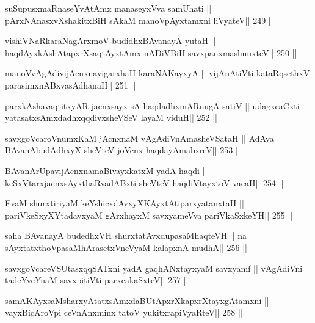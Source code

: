 \begin{shl}
suSupusxmaRnaseYvA\s\s tAmx manaseyxVva samUhati ||
pArxNAnasxvXshakitxBiH sAkaM manoV\s pAyxtamxni liVyateV\hfill || 249 ||
\end{shl}

\begin{shl}
vishiVNaRkaraNagArxmoV budidhxBAvanayA yutaH ||
haqdAyxkAshAtapxrXsaqtAyx\s\s tAmx nADiVBiH savxpanxmashunxteV\hfill || 250 ||
\end{shl}

\begin{shl}
manoVvAgAdivijAcnxnavigarxhaH karaNAKayxyA ||
vijAnAtiVti kataRqsethxV parasimxnABxvasAdhanaH\hfill || 251 ||
\end{shl}

\begin{shl}
parxkAshavaqtitxyAR jacnxsayx sA haqdadhxmARnugA satiV ||
udagxcaCxti yatasatxsAmxdadhxqqdivxsheVSeV layaM viduH\hfill || 252 ||
\end{shl}

\begin{shl}
savxgoVcaroVnumxKaM jAcnxnaM vAgAdiVnAmasheVSataH ||
AdAya BAvanAbudAdhxyX sheVteV joVcnx haqdayAmabxreV\hfill || 253 ||
\end{shl}

\begin{shl}
BAvanArUpavijAcnxnamaBivayxkatxM yadA haqdi ||
keSxVtarxjacnxsAyxthaRvadABxti sheVteV haqdiVtayxtoV vacaH\hfill || 254 ||
\end{shl}

\begin{shl}
EvaM shurxtiriyaM keYshicxdAvxyXKAyxtA\s tiparxyatanxtaH ||
pariVkeSxyXYtadavxyaM gArxhayxM savxyameVva pariVkaSxkeYH\hfill || 255 ||
\end{shl}

\begin{shl}
saha BAvanayA budedhxVH shurxtatAvxdupasaMhaqteVH ||
na sAyxtatxthoVpasaMhArasetxVneVyaM kalapxnA mudhA\hfill || 256 ||
\end{shl}

\begin{shl}
savxgoVcareVSUtasxqqSATxni yadA gaqhANxtayxyaM savxyamf ||
vAgAdiVni tadeYveYnaM savxpitiVti parxcakaSxteV\hfill || 257 ||
\end{shl}

\begin{shl}
samAKAyxsaMsharxyAtatxsAmxdaBUtApxrXkapxrXtayxgAtamxni ||
vayxBicAroV\s pi ceVnAnxminx tatoV yukitxrapiVyaRteV\hfill || 258 ||
\end{shl}

